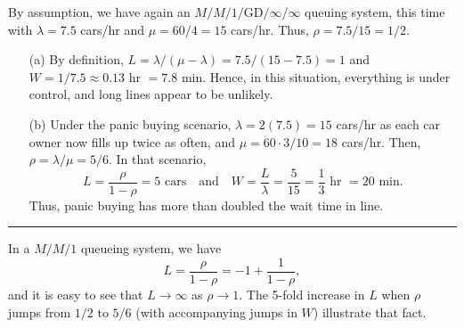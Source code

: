 By assumption, we have again an $M/M/1/\textrm{GD}/\infty/\infty$ queuing system, this time with $\lambda = 7.5$ cars/hr and $\mu = 60/4 = 15$ cars/hr.  Thus, $\rho = 7.5/15 = 1/2$.
\begin{enumerate}[noitemsep]
	\item[(a)] By definition, $L = \lambda/(\mu - \lambda) = 7.5/(15-7.5) = 1$ and $W = 1/7.5 \approx 0.13$ hr $=7.8$ min. Hence, in this situation, everything is under control, and long lines appear to be unlikely.
\item[(b)] Under the panic buying scenario,  $\lambda = 2(7.5)=15$ cars/hr as each car owner now fills up twice as often, and $\mu = 60 \cdot 3 /10  = 18$ cars/hr.  Then, $\rho = \lambda/\mu = 5/6$. In that scenario,  
$$ L = \frac{\rho}{1-\rho} = 5 \text{ cars}\quad \mbox{and}\quad W = \frac{L}{\lambda} = \frac{5}{15} = \frac{1}{3} \text{ hr } = 20 \text{ min}.$$
Thus, panic buying has more than doubled the wait time in line.
\end{enumerate}
\begin{center}
    \rule{0.5\textwidth}{.4pt}
\end{center}
In a $M/M/1$ queueing system, we have $$L=\frac{\rho}{1-\rho}=-1+\frac{1}{1-\rho}, $$ and it is easy to see that $L\to\infty$ as $\rho\to 1$. The 5-fold increase in $L$ when $\rho$ jumps from $1/2$ to $5/6$ (with accompanying jumps in $W$) illustrate that fact. 
